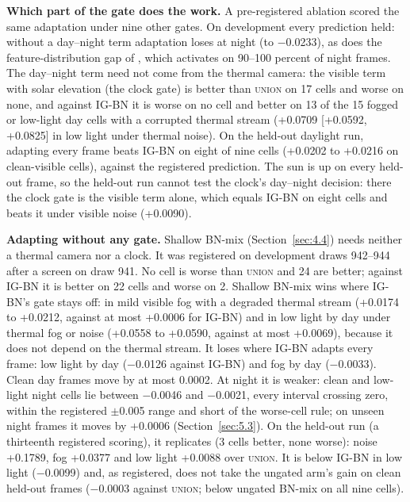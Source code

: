 \documentclass[journal]{IEEEtran}
\begin{document}
\textbf{Which part of the gate does the work.} A pre-registered ablation scored the same adaptation under nine other gates. On development every prediction held: without a day--night term adaptation loses at night (to $-$0.0233), as does the feature-distribution gap of \citet{yoo2024what}, which activates on 90--100 percent of night frames. The day--night term need not come from the thermal camera: the visible term with solar elevation (the clock gate) is better than \textsc{union} on 17 cells and worse on none, and against \mbox{IG-BN} it is worse on no cell and better on 13 of the 15 fogged or low-light day cells with a corrupted thermal stream (+0.0709 [+0.0592, +0.0825] in low light under thermal noise). On the held-out daylight run, adapting every frame beats \mbox{IG-BN} on eight of nine cells (+0.0202 to +0.0216 on clean-visible cells), against the registered prediction. The sun is up on every held-out frame, so the held-out run cannot test the clock's day--night decision: there the clock gate is the visible term alone, which equals \mbox{IG-BN} on eight cells and beats it under visible noise (+0.0090).

\textbf{Adapting without any gate.} Shallow BN-mix (Section~\ref{sec:4.4}) needs neither a thermal camera nor a clock. It was registered on development draws 942--944 after a screen on draw 941. No cell is worse than \textsc{union} and 24 are better; against \mbox{IG-BN} it is better on 22 cells and worse on 2. Shallow BN-mix wins where \mbox{IG-BN}'s gate stays off: in mild visible fog with a degraded thermal stream (+0.0174 to +0.0212, against at most +0.0006 for \mbox{IG-BN}) and in low light by day under thermal fog or noise (+0.0558 to +0.0590, against at most +0.0069), because it does not depend on the thermal stream. It loses where \mbox{IG-BN} adapts every frame: low light by day ($-$0.0126 against \mbox{IG-BN}) and fog by day ($-$0.0033). Clean day frames move by at most 0.0002. At night it is weaker: clean and low-light night cells lie between $-$0.0046 and $-$0.0021, every interval crossing zero, within the registered $\pm$0.005 range and short of the worse-cell rule; on unseen night frames it moves by +0.0006 (Section~\ref{sec:5.3}). On the held-out run (a thirteenth registered scoring), it replicates (3 cells better, none worse): noise +0.1789, fog +0.0377 and low light +0.0088 over \textsc{union}. It is below \mbox{IG-BN} in low light ($-$0.0099) and, as registered, does not take the ungated arm's gain on clean held-out frames ($-$0.0003 against \textsc{union}; below ungated BN-mix on all nine cells).
\end{document}
